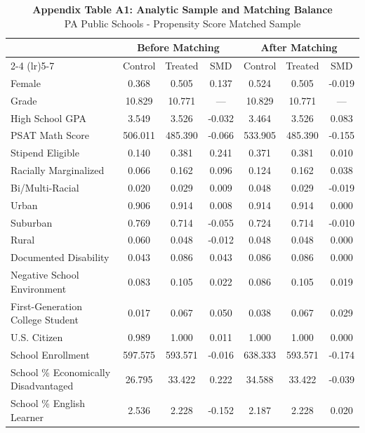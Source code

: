 \begin{table}[t]
\caption*{
{\fontsize{10}{12}\selectfont  \textbf{Appendix Table A1: Analytic Sample and Matching Balance}\fontsize{8}{10}\selectfont } \\ 
{\fontsize{8}{10}\selectfont  PA Public Schools - Propensity Score Matched Sample\fontsize{8}{10}\selectfont }
} 
\fontsize{8.0pt}{10.0pt}\selectfont
\begin{tabular*}{\linewidth}{@{\extracolsep{\fill}}l|cccccc}
\toprule
 & \multicolumn{3}{c}{Before Matching} & \multicolumn{3}{c}{After Matching} \\ 
\cmidrule(lr){2-4} \cmidrule(lr){5-7}
 & Control & Treated & SMD & Control & Treated & SMD \\ 
\midrule\addlinespace[2.5pt]
Female & {0.368} & {0.505} & {0.137} & {0.524} & {0.505} & {-0.019} \\ 
Grade & 10.829 & 10.771 & — & 10.829 & 10.771 & — \\ 
High School GPA & 3.549 & 3.526 & -0.032 & 3.464 & 3.526 & 0.083 \\ 
PSAT Math Score & 506.011 & 485.390 & -0.066 & 533.905 & 485.390 & -0.155 \\ 
Stipend Eligible & 0.140 & 0.381 & 0.241 & 0.371 & 0.381 & 0.010 \\ 
Racially Marginalized & 0.066 & 0.162 & 0.096 & 0.124 & 0.162 & 0.038 \\ 
Bi/Multi-Racial & 0.020 & 0.029 & 0.009 & 0.048 & 0.029 & -0.019 \\ 
Urban & 0.906 & 0.914 & 0.008 & 0.914 & 0.914 & 0.000 \\ 
Suburban & 0.769 & 0.714 & -0.055 & 0.724 & 0.714 & -0.010 \\ 
Rural & 0.060 & 0.048 & -0.012 & 0.048 & 0.048 & 0.000 \\ 
Documented Disability & 0.043 & 0.086 & 0.043 & 0.086 & 0.086 & 0.000 \\ 
Negative School Environment & 0.083 & 0.105 & 0.022 & 0.086 & 0.105 & 0.019 \\ 
First-Generation College Student & 0.017 & 0.067 & 0.050 & 0.038 & 0.067 & 0.029 \\ 
U.S. Citizen & 0.989 & 1.000 & 0.011 & 1.000 & 1.000 & 0.000 \\ 
School Enrollment & 597.575 & 593.571 & -0.016 & 638.333 & 593.571 & -0.174 \\ 
School \% Economically Disadvantaged & 26.795 & 33.422 & 0.222 & 34.588 & 33.422 & -0.039 \\ 
School \% English Learner & 2.536 & 2.228 & -0.152 & 2.187 & 2.228 & 0.020 \\ 

\end{tabular*}
\end{table}
